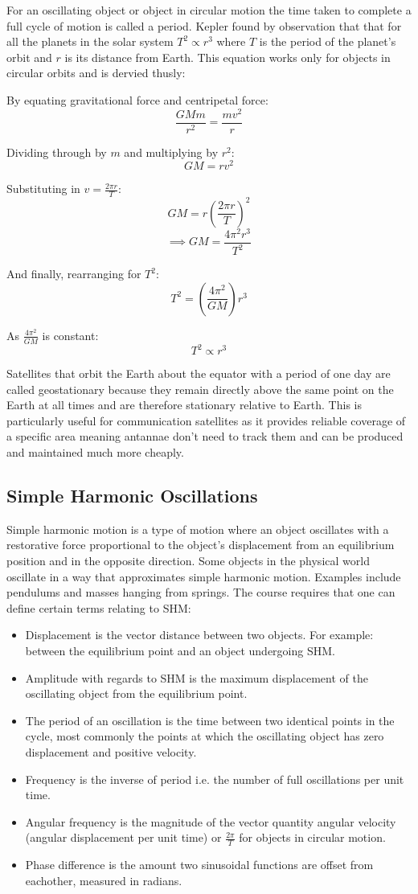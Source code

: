 \documentclass[a4,8pt]{article}
\begin{document}
For an oscillating object or object in circular motion the time taken to complete a full cycle of motion is called a period. Kepler found by observation that that for all the planets in the solar system $T^2 \propto r^3$ where $T$ is the period of the planet's orbit and $r$ is its distance from Earth. This equation works only for objects in circular orbits and is dervied thusly:

By equating gravitational force and centripetal force:
$$\frac{GMm}{r^2} = \frac{mv^2}{r}$$

Dividing through by $m$ and multiplying by $r^2$:
$$GM = rv^2$$

Substituting in $v = \frac{2 \pi r}{T}$:
$$GM = r\left(\frac{2 \pi r}{T}\right)^2$$
$$\implies GM = \frac{4 {\pi}^2 r^3}{T^2}$$

And finally, rearranging for $T^2$:
$$T^2 = \left(\frac{4 {\pi}^2}{GM}\right)r^3$$

As $\frac{4 {\pi}^2}{GM}$ is constant:
$$T^2 \propto r^3$$

Satellites that orbit the Earth about the equator with a period of one day are called geostationary because they remain directly above the same point on the Earth at all times and are therefore stationary relative to Earth. This is particularly useful for communication satellites as it provides reliable coverage of a specific area meaning antannae don't need to track them and can be produced and maintained much more cheaply.

\subsection{Simple Harmonic Oscillations}
Simple harmonic motion is a type of motion where an object oscillates with a restorative force proportional to the object's displacement from an equilibrium position and in the opposite direction. Some objects in the physical world oscillate in a way that approximates simple harmonic motion. Examples include pendulums and masses hanging from springs. The course requires that one can define certain terms relating to SHM:
\begin{itemize}
	\item Displacement is the vector distance between two objects. For example: between the equilibrium point and an object undergoing SHM.
	\item Amplitude with regards to SHM is the maximum displacement of the oscillating object from the equilibrium point.
	\item The period of an oscillation is the time between two identical points in the cycle, most commonly the points at which the oscillating object has zero displacement and positive velocity.
	\item Frequency is the inverse of period i.e. the number of full oscillations per unit time.
	\item Angular frequency is the magnitude of the vector quantity angular velocity (angular displacement per unit time) or $\frac{2\pi}{T}$ for objects in circular motion.
	\item Phase difference is the amount two sinusoidal functions are offset from eachother, measured in radians.
\end{itemize}
\end{document}
